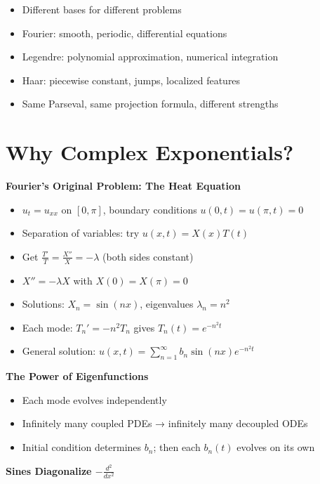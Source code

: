 \documentclass[
  10pt,
  letterpaper,
]{scrbook}
\providecommand{\tightlist}{%
  \setlength{\itemsep}{0pt}\setlength{\parskip}{0pt}}
\begin{document}
\begin{itemize}
\tightlist
\item
  Different bases for different problems
\item
  Fourier: smooth, periodic, differential equations
\item
  Legendre: polynomial approximation, numerical integration
\item
  Haar: piecewise constant, jumps, localized features
\item
  Same Parseval, same projection formula, different strengths
\end{itemize}

\section{Why Complex Exponentials?}\label{why-complex-exponentials}

\textbf{Fourier's Original Problem: The Heat Equation}

\begin{itemize}
\tightlist
\item
  \(u_t = u_{xx}\) on \([0, \pi]\), boundary conditions
  \(u(0,t) = u(\pi,t) = 0\)
\item
  Separation of variables: try \(u(x,t) = X(x)T(t)\)
\item
  Get \(\frac{T'}{T} = \frac{X''}{X} = -\lambda\) (both sides constant)
\item
  \(X'' = -\lambda X\) with \(X(0) = X(\pi) = 0\)
\item
  Solutions: \(X_n = \sin(nx)\), eigenvalues \(\lambda_n = n^2\)
\item
  Each mode: \(T_n' = -n^2 T_n\) gives \(T_n(t) = e^{-n^2 t}\)
\item
  General solution:
  \(u(x,t) = \sum_{n=1}^\infty b_n \sin(nx) e^{-n^2 t}\)
\end{itemize}

\textbf{The Power of Eigenfunctions}

\begin{itemize}
\tightlist
\item
  Each mode evolves independently
\item
  Infinitely many coupled PDEs → infinitely many decoupled ODEs
\item
  Initial condition determines \(b_n\); then each \(b_n(t)\) evolves on
  its own
\end{itemize}

\textbf{Sines Diagonalize \(-\frac{d^2}{dx^2}\)}
\end{document}
